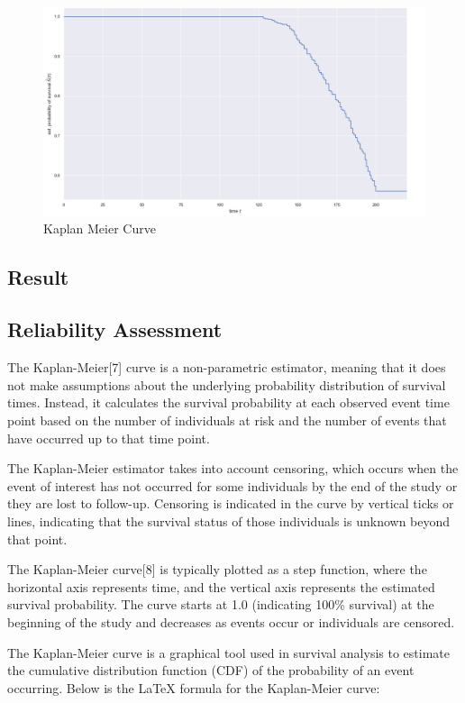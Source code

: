 \documentclass[conference]{IEEEconf}
\begin{document}
\begin{figure}[htbp]
	\centering
	\includegraphics[scale=0.26]{Kaplan_Meier.png}
	\caption{Kaplan Meier Curve}
\end{figure}
\subsection{Result}

\subsection{Reliability Assessment}

The Kaplan-Meier[7] curve is a non-parametric estimator, meaning that it does not make assumptions about the underlying probability distribution of survival times. Instead, it calculates the survival probability at each observed event time point based on the number of individuals at risk and the number of events that have occurred up to that time point.

The Kaplan-Meier estimator takes into account censoring, which occurs when the event of interest has not occurred for some individuals by the end of the study or they are lost to follow-up. Censoring is indicated in the curve by vertical ticks or lines, indicating that the survival status of those individuals is unknown beyond that point.

The Kaplan-Meier curve[8] is typically plotted as a step function, where the horizontal axis represents time, and the vertical axis represents the estimated survival probability. The curve starts at 1.0 (indicating 100\% survival) at the beginning of the study and decreases as events occur or individuals are censored.

The Kaplan-Meier curve is a graphical tool used in survival analysis to estimate the cumulative distribution function (CDF) of the probability of an event occurring. Below is the LaTeX formula for the Kaplan-Meier curve:
\end{document}
